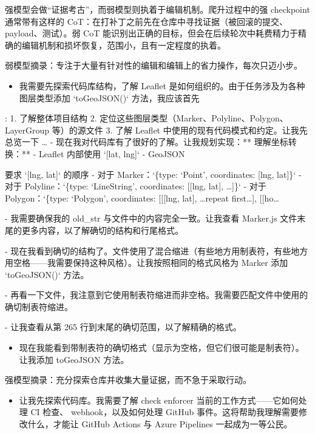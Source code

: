 强模型会做``证据考古''，而弱模型则执着于编辑机制。爬升过程中的强 checkpoint 通常带有这样的 CoT：在打补丁之前先在仓库中寻找证据（被回滚的提交、payload、测试）。弱 CoT 能识别出正确的目标，但会在后续轮次中耗费精力于精确的编辑机制和损坏恢复，范围小，且有一定程度的执着。

弱模型摘录：专注于大量有针对性的编辑和编辑上的省力操作，每次只迈小步。

\begin{itemize}
\tightlist
\item
  我需要先探索代码库结构，了解 Leaflet 是如何组织的。由于任务涉及为各种图层类型添加
  `toGeoJSON()` 方法，我应该首先
\end{itemize}

: 1. 了解整体项目结构 2. 定位这些图层类型（Marker、Polyline、Polygon、LayerGroup 等）的源文件 3. 了解 Leaflet 中使用的现有代码模式和约定。让我先总览一下 \ldots{} - 现在我对代码库有了很好的了解。让我规划实现：** 理解坐标转换：** - Leaflet 内部使用 `{[}lat, lng{]}` - GeoJSON



要求 `{[}lng, lat{]}` 的顺序 - 对于 Marker：`\{type: `Point', coordinates: {[}lng, lat{]}\}` - 对于 Polyline：`\{type: `LineString', coordinates: {[}{[}lng, lat{]}, \ldots{]}\}` - 对于 Polygon：`\{type: `Polygon', coordinates: {[}{[}{[}lng, lat{]}, \ldots repeat first\ldots{]}, {[}{[}ho\ldots{}

- 我需要确保我的 old\_str 与文件中的内容完全一致。让我查看 Marker.js 文件末尾的更多内容，以了解确切的结构和行尾格式。

- 现在我看到确切的结构了。文件使用了混合缩进（有些地方用制表符，有些地方用空格——我需要保持这种风格）。让我按照相同的格式风格为 Marker 添加 `toGeoJSON()` 方法。

- 再看一下文件，我注意到它使用制表符缩进而非空格。我需要匹配文件中使用的确切制表符缩进。

- 让我查看从第 265 行到末尾的确切范围，以了解精确的格式。

\begin{itemize}
\tightlist
\item
  现在我能看到带制表符的确切格式（显示为空格，但它们很可能是制表符）。让我添加
  toGeoJSON 方法。
\end{itemize}

强模型摘录：充分探索仓库并收集大量证据，而不急于采取行动。

\begin{itemize}
\tightlist
\item
  让我先探索代码库。我需要了解 check enforcer 当前的工作方式——它如何处理 CI 检查、
  webhook，以及如何处理 GitHub 事件。这将帮助我理解需要修改什么，才能让 GitHub
  Actions 与 Azure Pipelines 一起成为一等公民。
\end{itemize}


